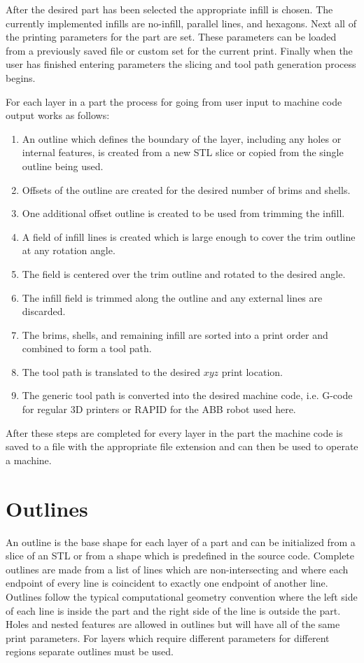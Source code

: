 \documentclass[main.tex]{subfiles}
\begin{document}
After the desired part has been selected the appropriate infill is chosen.
The currently implemented infills are no-infill, parallel lines, and hexagons.
Next all of the printing parameters for the part are set.
These parameters can be loaded from a previously saved file or custom set for the current print.
Finally when the user has finished entering parameters the slicing and tool path generation process begins.

For each layer in a part the process for going from user input to machine code output works as follows:
\begin{enumerate}
	\item An outline which defines the boundary of the layer, including any holes or internal features, is created from a new STL slice or copied from the single outline being used.
	\item Offsets of the outline are created for the desired number of brims and shells.
	\item One additional offset outline is created to be used from trimming the infill.
	\item A field of infill lines is created which is large enough to cover the trim outline at any rotation angle.
	\item The field is centered over the trim outline and rotated to the desired angle.
	\item The infill field is trimmed along the outline and any external lines are discarded.
	\item The brims, shells, and remaining infill are sorted into a print order and combined to form a tool path.
	\item The tool path is translated to the desired $xyz$ print location.
	\item The generic tool path is converted into the desired machine code, i.e. G-code for regular 3D printers or RAPID for the ABB robot used here.
	
\end{enumerate}

After these steps are completed for every layer in the part the machine code is saved to a file with the appropriate file extension and can then be used to operate a machine.

\section{Outlines}
An outline is the base shape for each layer of a part and can be initialized from a slice of an STL or from a shape which is predefined in the source code.
Complete outlines are made from a list of lines which are non-intersecting and where each endpoint of every line is coincident to exactly one endpoint of another line.
Outlines follow the typical computational geometry convention where the left side of each line is inside the part and the right side of the line is outside the part.
Holes and nested features are allowed in outlines but will have all of the same print parameters.
For layers which require different parameters for different regions separate outlines must be used. 
\end{document}
